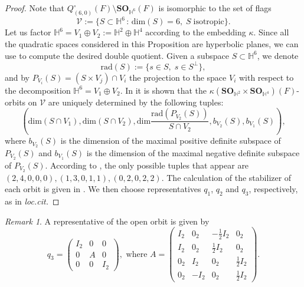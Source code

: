 \documentclass[11pt, reqno]{amsart}
\theoremstyle{plain}
\theoremstyle{definition}
\theoremstyle{remark}
\newtheorem{remark}[theorem]{Remark}
\theoremstyle{plain}
\begin{document}
\begin{proof}
    Note that $Q_{(6,0)}^{\circ}(F)\setminus \mathbf{SO}_{\mathbb{H}^6}(F)$ is isomorphic to the set of flags $$ \mathcal{V} := \{S\subset \mathbb{H}^6\,:\,\mathrm{dim}(S) = 6,\;S\;\text{isotropic}\}.$$ Let us factor $\mathbb{H}^6 = V_1\oplus V_2 := \mathbb{H}^2\oplus \mathbb{H}^4$ according to the embedding $\kappa$. Since all the quadratic spaces considered in this Proposition are hyperbolic planes, we can use \cite[\S 5]{Huang:He} to compute the desired double quotient. Given a subspace $S\subset \mathbb{H}^6$, we denote 
    \[\mathrm{rad}(S) := \{s\in S,\;s\in S^{\perp}\},\]
    and by $P_{V_i}(S) = (S\times V_j)\cap V_i$ the projection to the space $V_i$ with respect to the decomposition $\mathbb{H}^6 = V_1\oplus V_2 $. In \cite[\S 5]{Huang:He} it is shown that the $\kappa(\mathbf{SO}_{\mathbb{H}^2}\times \mathbf{SO}_{\mathbb{H}^4})(F)$-orbits on $\mathcal{V}$ are uniquely determined by the following tuples:
    \[\left(\mathrm{dim}(S\cap V_1),\mathrm{dim}(S\cap V_2),\mathrm{dim}\frac{\mathrm{rad}(P_{V_2}(S))}{S\cap V_2},b_{V_2}(S),b_{V_1}(S)\right),\]
    where $b_{V_2}(S)$ is the dimension of the maximal positive definite subspace of $P_{V_2}(S)$ and $b_{V_1}(S)$ is the dimension of the maximal negative definite subspace of $P_{V_2}(S)$. According to \cite[Theorem 5.2]{Huang:He}, the only possible tuples that appear are $(2,4,0,0,0),(1,3,0,1,1),(0,2,0,2,2)$. The calculation of the stabilizer of each orbit is given in \cite[\S 2.3]{Huang:He}. We then choose representatives $q_1$, $q_2$ and $q_3$, respectively, as in \emph{loc.cit.}
\end{proof}
\begin{remark}
   A representative of the open orbit is given by    \[q_3 = \left(\begin{smallmatrix}
I_2 & 0 & 0 \\
0& A & 0 \\  0 & 0 & I_2
\end{smallmatrix}\right), \text{ where } A = \left(\begin{smallmatrix}
 I_2 & 0_2 & -\frac{1}{2} I_2 & 0_2  \\
 I_2  & 0_2 & \frac{1}{2} I_2 & 0_2  \\
 0_2 & I_2  & 0_2 & \frac{1}{2} I_2  \\
 0_2 & -I_2  & 0_2 & \frac{1}{2} I_2
\end{smallmatrix}\right). \]
\end{remark}
\end{document}
